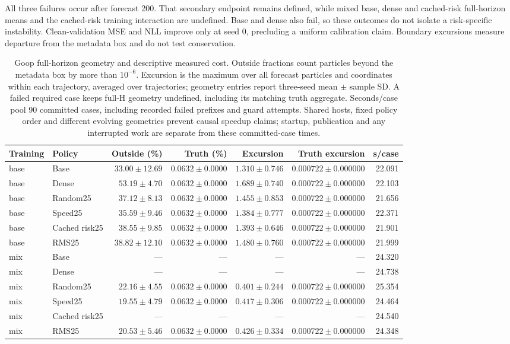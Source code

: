 All three failures occur after forecast 200. That secondary endpoint remains defined, while mixed base, dense and cached-risk full-horizon means and the cached-risk training interaction are undefined. Base and dense also fail, so these outcomes do not isolate a risk-specific instability. Clean-validation MSE and NLL improve only at seed 0, precluding a uniform calibration claim. Boundary excursions measure departure from the metadata box and do not test conservation.


\begin{table}[t]
\centering\scriptsize
\caption{Goop full-horizon geometry and descriptive measured cost. Outside fractions count particles beyond the metadata box by more than $10^{-6}$. Excursion is the maximum over all forecast particles and coordinates within each trajectory, averaged over trajectories; geometry entries report three-seed mean $\pm$ sample SD. A failed required case keeps full-H geometry undefined, including its matching truth aggregate. Seconds/case pool 90 committed cases, including recorded failed prefixes and guard attempts. Shared hosts, fixed policy order and different evolving geometries prevent causal speedup claims; startup, publication and any interrupted work are separate from these committed-case times.}
\label{tab:goop-all-cost}
\begin{tabular}{llrrrrr}
\toprule
Training & Policy & Outside (\%) & Truth (\%) & Excursion & Truth excursion & s/case\\
\midrule
base & Base & $33.00\pm12.69$ & $0.0632\pm0.0000$ & $1.310\pm0.746$ & $0.000722\pm0.000000$ & 22.091\\
base & Dense & $53.19\pm4.70$ & $0.0632\pm0.0000$ & $1.689\pm0.740$ & $0.000722\pm0.000000$ & 22.103\\
base & Random25 & $37.12\pm8.13$ & $0.0632\pm0.0000$ & $1.455\pm0.853$ & $0.000722\pm0.000000$ & 21.656\\
base & Speed25 & $35.59\pm9.46$ & $0.0632\pm0.0000$ & $1.384\pm0.777$ & $0.000722\pm0.000000$ & 22.371\\
base & Cached risk25 & $38.55\pm9.85$ & $0.0632\pm0.0000$ & $1.393\pm0.646$ & $0.000722\pm0.000000$ & 21.901\\
base & RMS25 & $38.82\pm12.10$ & $0.0632\pm0.0000$ & $1.480\pm0.760$ & $0.000722\pm0.000000$ & 21.999\\
\midrule
mix & Base & --- & --- & --- & --- & 24.320\\
mix & Dense & --- & --- & --- & --- & 24.738\\
mix & Random25 & $22.16\pm4.55$ & $0.0632\pm0.0000$ & $0.401\pm0.244$ & $0.000722\pm0.000000$ & 25.354\\
mix & Speed25 & $19.55\pm4.79$ & $0.0632\pm0.0000$ & $0.417\pm0.306$ & $0.000722\pm0.000000$ & 24.464\\
mix & Cached risk25 & --- & --- & --- & --- & 24.540\\
mix & RMS25 & $20.53\pm5.46$ & $0.0632\pm0.0000$ & $0.426\pm0.334$ & $0.000722\pm0.000000$ & 24.348\\
\bottomrule
\end{tabular}
\end{table}

